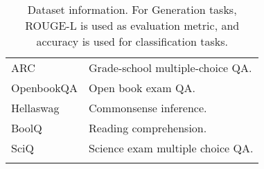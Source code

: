 \begin{table}[t!]
\begin{tabular}{@{}llll@{}}
ARC & \multicolumn{3}{l}{Grade-school multiple-choice QA.}   \\
OpenbookQA &  \multicolumn{3}{l}{Open book exam QA.} \\
Hellaswag &  \multicolumn{3}{l}{Commonsense inference.} \\
BoolQ & \multicolumn{3}{l}{Reading comprehension.}  \\
SciQ & \multicolumn{3}{l}{Science exam multiple choice QA.}  \\ \arrayrulecolor{black}\bottomrule

\end{tabular}
\caption{Dataset information. For Generation tasks, ROUGE-L is used as evaluation metric, and accuracy is used for classification tasks.}
\label{tab:tasks}
\end{table}